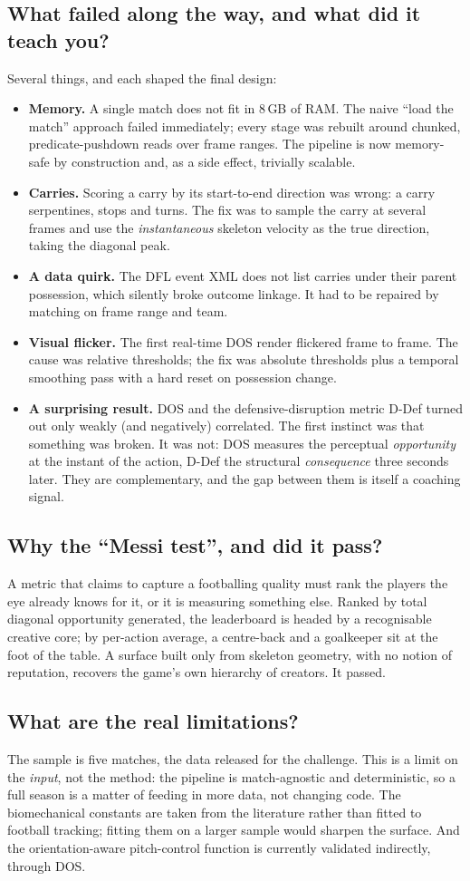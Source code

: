 \documentclass[11pt]{article}
\newcommand{\faq}[1]{\subsection{#1}}
\begin{document}
\faq{What failed along the way, and what did it teach you?}
Several things, and each shaped the final design:
\begin{itemize}[leftmargin=1.3em,topsep=2pt,itemsep=2pt]
  \item \textbf{Memory.} A single match does not fit in 8\,GB of RAM. The
  naive ``load the match'' approach failed immediately; every stage was
  rebuilt around chunked, predicate-pushdown reads over frame ranges. The
  pipeline is now memory-safe by construction and, as a side effect,
  trivially scalable.
  \item \textbf{Carries.} Scoring a carry by its start-to-end direction was
  wrong: a carry serpentines, stops and turns. The fix was to sample the
  carry at several frames and use the \emph{instantaneous} skeleton
  velocity as the true direction, taking the diagonal peak.
  \item \textbf{A data quirk.} The DFL event XML does not list carries
  under their parent possession, which silently broke outcome linkage. It
  had to be repaired by matching on frame range and team.
  \item \textbf{Visual flicker.} The first real-time DOS render flickered
  frame to frame. The cause was relative thresholds; the fix was absolute
  thresholds plus a temporal smoothing pass with a hard reset on possession
  change.
  \item \textbf{A surprising result.} DOS and the defensive-disruption
  metric D-Def turned out only weakly (and negatively) correlated. The
  first instinct was that something was broken. It was not: DOS measures the
  perceptual \emph{opportunity} at the instant of the action, D-Def the
  structural \emph{consequence} three seconds later. They are complementary,
  and the gap between them is itself a coaching signal.
\end{itemize}

\faq{Why the ``Messi test'', and did it pass?}
A metric that claims to capture a footballing quality must rank the players
the eye already knows for it, or it is measuring something else. Ranked by
total diagonal opportunity generated, the leaderboard is headed by a
recognisable creative core; by per-action average, a centre-back and a
goalkeeper sit at the foot of the table. A surface built only from skeleton
geometry, with no notion of reputation, recovers the game's own hierarchy
of creators. It passed.

\faq{What are the real limitations?}
The sample is five matches, the data released for the challenge. This is
a limit on the \emph{input}, not the method: the pipeline is match-agnostic
and deterministic, so a full season is a matter of feeding in more data,
not changing code. The biomechanical constants are taken from the
literature rather than fitted to football tracking; fitting them on a
larger sample would sharpen the surface. And the orientation-aware
pitch-control function is currently validated indirectly, through DOS.
\end{document}
